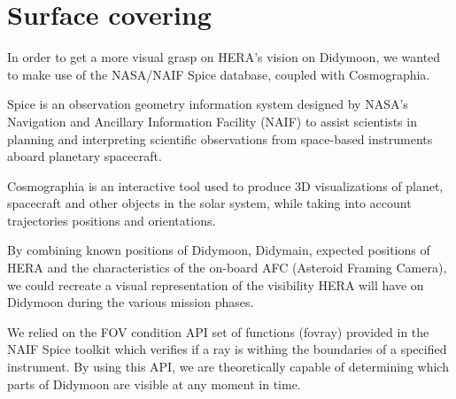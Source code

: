 \section{Surface covering}
\label{sec:8}

In order to get a more visual grasp on HERA's vision on Didymoon, we wanted to make use of the NASA/NAIF Spice database, coupled with Cosmographia.

Spice is an observation geometry information system designed by NASA's Navigation and Ancillary Information Facility (NAIF) to assist scientists in planning and interpreting scientific observations from space-based instruments aboard planetary spacecraft. 

Cosmographia is an interactive tool used to produce 3D visualizations of planet, spacecraft and other objects in the solar system, while taking into account trajectories positions and orientations.

By combining known positions of Didymoon, Didymain, expected positions of HERA and the characteristics of the on-board AFC (Asteroid Framing Camera), we could recreate a visual representation of the visibility HERA will have on Didymoon during the various mission phases. 

We relied on the FOV condition API set of functions (fovray) provided in the NAIF Spice toolkit which verifies if a ray is withing the boundaries of a specified instrument. By using this API, we are theoretically capable of determining which parts of Didymoon are visible at any moment in time. 
